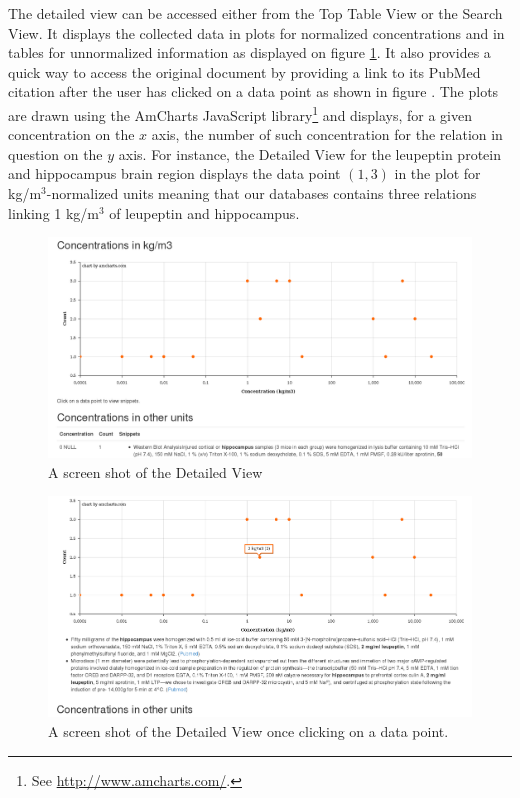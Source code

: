 \documentclass{report}
\begin{document}
			The detailed view can be accessed either from the Top Table View or the Search View. It displays
			the collected data in plots for normalized concentrations and in tables for unnormalized information as displayed on figure \ref{fig:detailed_view}.
			It also provides a quick way to access the original document by providing a link to its PubMed citation
			after the user has clicked on a data point as shown in figure \label{fig:detailed_view_2}. The plots
			are drawn using the AmCharts JavaScript library\footnote{See \url{http://www.amcharts.com/}.} and displays, for a given concentration on the
			$x$ axis, the number of such concentration for the relation in 
			question on the $y$ axis. For instance, the Detailed View for the 
			leupeptin protein and hippocampus brain region displays the data 
			point $(1,3)$ in the plot for kg/m$^3$-normalized units meaning that
			our databases contains three relations linking 1 kg/m$^3$ of leupeptin 
			and hippocampus.  
			\begin{figure}[t]
				\includegraphics[width=\textwidth]{fig/detailed_view_screenshot.png}
				\caption{A screen shot of the Detailed View}
				\label{fig:detailed_view}
			\end{figure}
			\begin{figure}[b]
				\includegraphics[width=\textwidth]{fig/detailed_view_screenshot_2.png}
				\caption{A screen shot of the Detailed View once clicking on a data point.}
				\label{fig:detailed_view_2}
			\end{figure}
			
\end{document}
